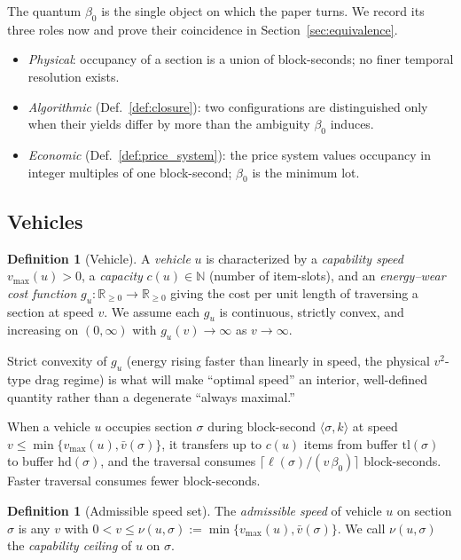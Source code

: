\documentclass[11pt,twocolumn,a4paper]{article}
\theoremstyle{definition}
\newtheorem{definition}[theorem]{Definition}
\theoremstyle{remark}
\newcommand{\Rnn}{\mathbb{R}_{\geq 0}}
\newcommand{\N}{\mathbb{N}}
\newcommand{\blocktime}{\beta_0}
\begin{document}
The quantum $\blocktime$ is the single object on which the paper turns. We record its three roles now and prove their coincidence in Section~\ref{sec:equivalence}.

\begin{itemize}[nosep]
\item \emph{Physical}: occupancy of a section is a union of block-seconds; no finer temporal resolution exists.
\item \emph{Algorithmic} (Def.~\ref{def:closure}): two configurations are distinguished only when their yields differ by more than the ambiguity $\blocktime$ induces.
\item \emph{Economic} (Def.~\ref{def:price_system}): the price system values occupancy in integer multiples of one block-second; $\blocktime$ is the minimum lot.
\end{itemize}

\subsection{Vehicles}

\begin{definition}[Vehicle]
\label{def:vehicle}
A \emph{vehicle} $u$ is characterized by a \emph{capability speed} $v_{\max}(u) > 0$, a \emph{capacity} $c(u)\in\N$ (number of item-slots), and an \emph{energy--wear cost function} $g_u:\Rnn\to\Rnn$ giving the cost per unit length of traversing a section at speed $v$. We assume each $g_u$ is continuous, strictly convex, and increasing on $(0,\infty)$ with $g_u(v)\to\infty$ as $v\to\infty$.
\end{definition}

Strict convexity of $g_u$ (energy rising faster than linearly in speed, the physical $v^2$-type drag regime) is what will make ``optimal speed'' an interior, well-defined quantity rather than a degenerate ``always maximal.''

When a vehicle $u$ occupies section $\sigma$ during block-second $\langle\sigma,k\rangle$ at speed $v\le \min\{v_{\max}(u),\bar v(\sigma)\}$, it transfers up to $c(u)$ items from buffer $\mathrm{tl}(\sigma)$ to buffer $\mathrm{hd}(\sigma)$, and the traversal consumes $\lceil \ell(\sigma)/(v\,\blocktime)\rceil$ block-seconds. Faster traversal consumes fewer block-seconds.

\begin{definition}[Admissible speed set]
\label{def:speedset}
The \emph{admissible speed} of vehicle $u$ on section $\sigma$ is any $v$ with $0 < v \le \nu(u,\sigma) := \min\{v_{\max}(u),\bar v(\sigma)\}$. We call $\nu(u,\sigma)$ the \emph{capability ceiling} of $u$ on $\sigma$.
\end{definition}
\end{document}
